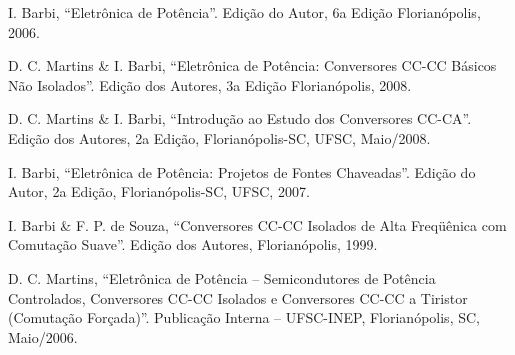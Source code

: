 \documentclass[
	article,			%
	12pt,				%
	twoside,			%
	a4paper,			%
	english,			%
	brazil,				%
	sumario=tradicional
]{abntex2-modelo-plano-de-aula}
\begin{document}
\clearpage
\pagestyle{plain}
\begin{thebibliography}{}
	
	 I. Barbi, “Eletrônica de Potência”. Edição do Autor, 6a Edição Florianópolis,
	2006.
	
	 D. C. Martins \& I. Barbi, “Eletrônica de Potência: Conversores CC-CC Básicos Não Isolados”. Edição dos Autores, 3a Edição Florianópolis, 2008.
	
		D. C. Martins \& I. Barbi, “Introdução ao Estudo dos Conversores CC-CA”. Edição dos Autores, 2a Edição, Florianópolis-SC, UFSC, Maio/2008.
	
	 I. Barbi, “Eletrônica de Potência: Projetos de Fontes Chaveadas”. Edição do
	Autor, 2a Edição, Florianópolis-SC, UFSC, 2007.
	
		I. Barbi \& F. P. de Souza, “Conversores CC-CC Isolados de Alta Freqüênica com Comutação Suave”. Edição dos Autores, Florianópolis, 1999.
	
		D. C. Martins, “Eletrônica de Potência – Semicondutores de Potência
	Controlados, Conversores CC-CC Isolados e Conversores CC-CC a Tiristor
	(Comutação Forçada)”. Publicação Interna – UFSC-INEP, Florianópolis, SC,
	Maio/2006.
	
\end{thebibliography}






\end{document}
